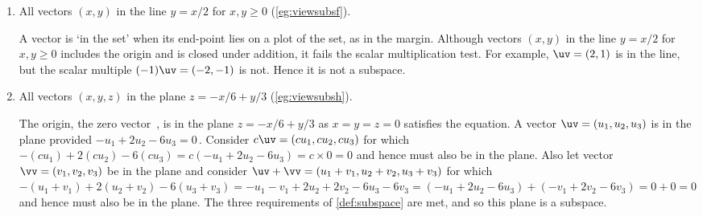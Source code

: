 \begin{example}
\begin{enumerate}[ref=\ref{eg:somsubs}(\alph*)]
\item All vectors \((x,y)\) in the line \(y=x/2\) for \(x,y\geq0\) (\cref{eg:viewsubsf}).
\begin{solution} 
A vector is `in the set' when its end-point lies on a plot of the set, as in the margin.
%
Although vectors \((x,y)\) in the line \(y=x/2\) for \(x,y\geq0\) includes the origin and is closed under addition, it fails the scalar multiplication test.
For example, \(\uv=(2,1)\) is in the line, but the scalar multiple \((-1)\uv=(-2,-1)\) is not.
Hence it is not a subspace.
\end{solution}


\item All vectors \((x,y,z)\) in the plane \(z=-x/6+y/3\) (\cref{eg:viewsubsh}).
\begin{center}
\end{center}
\begin{solution} 
The origin, the zero vector~\ov, is in the plane \(z=-x/6+y/3\) as \(x=y=z=0\) satisfies the equation.
A vector \(\uv=(u_1,u_2,u_3)\) is in the plane provided \(-u_1+2u_2-6u_3=0\)\,.
Consider \(c\uv=(cu_1,cu_2,cu_3)\) for which \(-(cu_1)+2(cu_2)-6(cu_3) =c(-u_1+2u_2-6u_3) =c\times0=0\) and hence must also be in the plane.
Also let vector \(\vv=(v_1,v_2,v_3)\) be in the plane and consider \(\uv+\vv=(u_1+v_1,u_2+v_2,u_3+v_3)\) for which \(-(u_1+v_1)+2(u_2+v_2)-6(u_3+v_3) =-u_1-v_1+2u_2+2v_2-6u_3-6v_3 =(-u_1+2u_2-6u_3) +(-v_1+2v_2-6v_3) =0+0 =0\) and hence must also be in the plane.
The three requirements of \cref{def:subspace} are met, and so this plane is a subspace.
\end{solution}



\end{enumerate}
\end{example}
